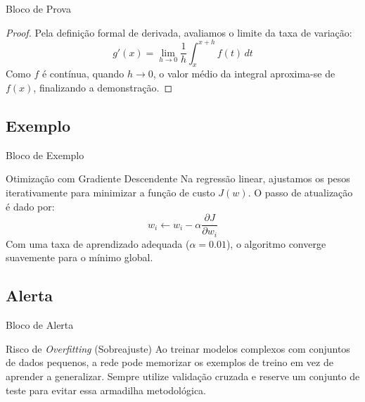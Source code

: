 \documentclass[aspectratio=169]{beamer}
\begin{document}
\begin{frame}{Bloco de Prova}


    \begin{proof}
        Pela definição formal de derivada, avaliamos o limite da taxa de variação:
        $$g'(x) = \lim_{h \to 0} \frac{1}{h} \int_{x}^{x+h} f(t) \, dt$$
        Como $f$ é contínua, quando $h \to 0$, o valor médio da integral aproxima-se de $f(x)$, finalizando a demonstração.
    \end{proof}

\end{frame}

\subsection{Exemplo}

\begin{frame}{Bloco de Exemplo}


    \begin{exampleblock}{Otimização com Gradiente Descendente}
        Na regressão linear, ajustamos os pesos iterativamente para minimizar a função de custo $J(w)$. O passo de atualização é dado por:
        $$w_{i} \leftarrow w_{i} - \alpha \frac{\partial J}{\partial w_{i}}$$
        Com uma taxa de aprendizado adequada ($\alpha = 0.01$), o algoritmo converge suavemente para o mínimo global.
    \end{exampleblock}
    
\end{frame}

\subsection{Alerta}

\begin{frame}{Bloco de Alerta}


    \begin{alertblock}{Risco de \textit{Overfitting} (Sobreajuste)}
        Ao treinar modelos complexos com conjuntos de dados pequenos, a rede pode 
        memorizar os exemplos de treino em vez de aprender a generalizar. Sempre utilize 
        validação cruzada e reserve um conjunto de teste para evitar essa armadilha 
        metodológica.
    \end{alertblock}
    
\end{frame}
\end{document}
